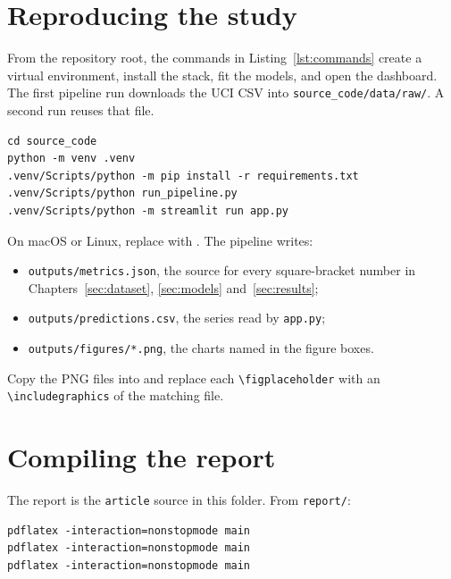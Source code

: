 \appendix

\section{Reproducing the study}
\label{sec:reproduce}

From the repository root, the commands in Listing~\ref{lst:commands} create a
virtual environment, install the stack, fit the models, and open the
dashboard. The first pipeline run downloads the UCI CSV into
\texttt{source\_code/data/raw/}. A second run reuses that file.

\begin{lstlisting}[style=python, caption={Setup, training and dashboard.}, label={lst:commands}]
cd source_code
python -m venv .venv
.venv/Scripts/python -m pip install -r requirements.txt
.venv/Scripts/python run_pipeline.py
.venv/Scripts/python -m streamlit run app.py
\end{lstlisting}

On macOS or Linux, replace  with
. The pipeline writes:

\begin{itemize}[itemsep=1pt]
  \item \texttt{outputs/metrics.json}, the source for every square-bracket
        number in Chapters~\ref{sec:dataset}, \ref{sec:models} and~\ref{sec:results};
  \item \texttt{outputs/predictions.csv}, the series read by \texttt{app.py};
  \item \texttt{outputs/figures/*.png}, the charts named in the figure boxes.
\end{itemize}

Copy the PNG files into  and replace each
\verb|\figplaceholder| with an \verb|\includegraphics| of the matching file.

\section{Compiling the report}

The report is the \texttt{article} source in this folder. From
\texttt{report/}:

\begin{lstlisting}[style=python, caption={Three pdflatex passes.}, label={lst:latex}]
pdflatex -interaction=nonstopmode main
pdflatex -interaction=nonstopmode main
pdflatex -interaction=nonstopmode main
\end{lstlisting}

